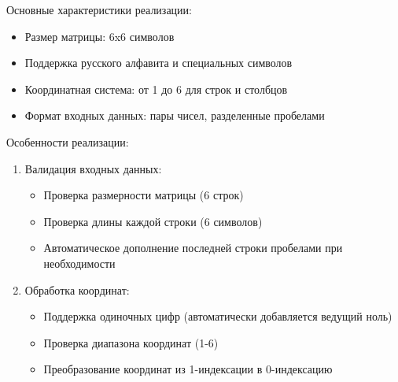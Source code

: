 \documentclass[a4paper, 14pt]{extarticle}
\begin{document}
Основные характеристики реализации:
\begin{itemize}
    \item Размер матрицы: 6x6 символов
    \item Поддержка русского алфавита и специальных символов
    \item Координатная система: от 1 до 6 для строк и столбцов
    \item Формат входных данных: пары чисел, разделенные пробелами
\end{itemize}

Особенности реализации:
\begin{enumerate}
    \item Валидация входных данных:
    \begin{itemize}
        \item Проверка размерности матрицы (6 строк)
        \item Проверка длины каждой строки (6 символов)
        \item Автоматическое дополнение последней строки пробелами при необходимости
    \end{itemize}
    \item Обработка координат:
    \begin{itemize}
        \item Поддержка одиночных цифр (автоматически добавляется ведущий ноль)
        \item Проверка диапазона координат (1-6)
        \item Преобразование координат из 1-индексации в 0-индексацию
    \end{itemize}
\end{enumerate}
\end{document}
